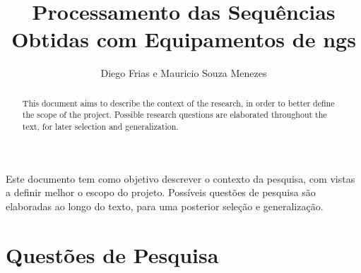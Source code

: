 \documentclass[12pt]{article}
\title{Processamento das Sequências Obtidas com Equipamentos de \gls{ngs}}
\author{Diego Frias e Mauricio Souza Menezes\\}
\begin{document}

\maketitle

\begin{resumo}
    Este documento tem como objetivo descrever o contexto da pesquisa, com vistas a definir melhor o escopo do projeto. Possíveis questões de pesquisa são elaboradas ao longo do texto, para uma posterior seleção e generalização.
\end{resumo}


\begin{abstract}
    \begin{otherlanguage}{english}
        This document aims to describe the context of the research, in order to better define the scope of the project. Possible research questions are elaborated throughout the text, for later selection and generalization.
    \end{otherlanguage}
\end{abstract}


\section{Questões de Pesquisa}
\end{document}
